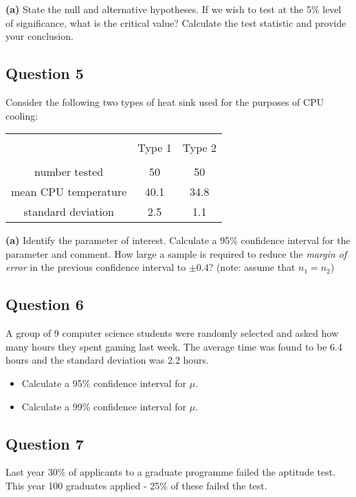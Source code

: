 \documentclass[12pt]{article}
\begin{document}
{\bf(a)} State the null and alternative hypotheses.  If we wish to test at the 5\% level of significance, what is the critical value?  Calculate the test statistic and provide your conclusion.



	\newpage\subsection*{Question 5}
	Consider the following two types of heat sink used for the purposes of CPU cooling:\\[-0.4cm]
	\begin{center}
		\begin{tabular}{|c|c|c|}
			\hline
			&&\\[-0.3cm]
			& Type 1 & Type 2 \\
			\hline
			&&\\[-0.3cm]
			number tested      & 50 & 50 \\
			mean CPU temperature   & 40.1  & 34.8 \\
			standard deviation &  2.5 & 1.1 \\[0.1cm]
			\hline
		\end{tabular}
	\end{center}
	
	{\bf(a)} Identify the parameter of interest.  Calculate a 95\% confidence interval for the parameter and comment.  How large a sample is required to reduce the \emph{margin of error} in the previous confidence interval to $\pm 0.4$? (note: assume that $n_1 = n_2$)
	
	

	
\subsection*{Question 6}
A group of 9 computer science students were randomly selected and asked how many hours they spent gaming last week. The average time was found to be 6.4 hours and the standard deviation was 2.2 hours.
\begin{itemize}
	\item[{\bf(a)}] Calculate a 95\% confidence interval for $\mu$. \item[{\bf(b)}] Calculate a 99\% confidence interval for $\mu$.
\end{itemize}






\subsection*{Question 7}
Last year 30\% of applicants to a graduate programme failed the aptitude test. This year 100 graduates applied - 25\% of these failed the test.\\[-0.2cm]
\end{document}
